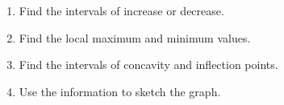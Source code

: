 \documentclass[11pt,fleqn]{article}
\begin{document}
\begin{enumerate}
\begin{enumerate}
    \item Find the intervals of increase or decrease. 
\vfill
  \item Find the local maximum and minimum values. 
\vfill
  \item Find the intervals of concavity and inflection points.
\vfill
  \item Use the information to sketch the graph. 
  \vfill
  \end{enumerate}
\newpage



\end{enumerate}
\end{document}
